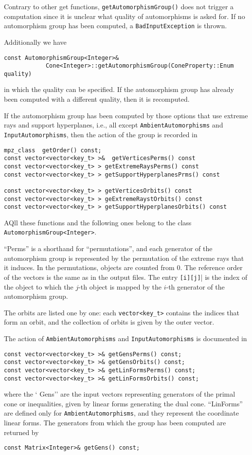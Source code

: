 \documentclass[12pt,a4paper]{scrartcl}
\theoremstyle{definition}
\begin{document}
\begin{small}
Contrary to other get functions, \verb|getAutomorphismGroup()| does not trigger a computation since it is unclear what quality of automorphisms is asked for. If no automorphism group has been computed, a \verb|BadInputException| is thrown.

Additionally we have
\begin{Verbatim}
const AutomorphismGroup<Integer>& 
            Cone<Integer>::getAutomorphismGroup(ConeProperty::Enum quality)
\end{Verbatim}
in which the quality can be specified. If the automorphism group has already been computed with a different quality, then it is recomputed.

If the automorphism group has been computed by those options that use extreme rays and support hyperplanes, i.e., all except \verb|AmbientAutomorphisms| and \verb|InputAutomorphisms|, then the action of the group is recorded in
\begin{Verbatim}
mpz_class  getOrder() const;
const vector<vector<key_t> >&  getVerticesPerms() const
const vector<vector<key_t> > getExtremeRaysPerms() const
const vector<vector<key_t> > getSupportHyperplanesPrms() const

const vector<vector<key_t> > getVerticesOrbits() const
const vector<vector<key_t> > geExtremeRaystOrbits() const
const vector<vector<key_t> > getSupportHyperplanesOrbits() const
\end{Verbatim}
AQll these functions and the following ones belong to the class \verb|AutomorphismGroup<Integer>|.

``Perms'' is a shorthand for ``permutations'', and each generator of the automorphism group is represented by the permutation of the extreme rays that it induces. In the permutations, objects are counted from $0$. The reference order of the vectors is the same as in the output files. The entry \verb|[i][j]|| is the index of the object to which the $j$-th object is mapped by the $i$-th generator of the automorphism group.

The orbits are listed one by one: each \verb|vector<key_t>| contains the indices that form an orbit, and the collection of orbits is given by the outer vector.

The action  of \verb|AmbientAutomorphisms| and \verb|InputAutomorphisms| is documented in
\begin{Verbatim}
const vector<vector<key_t> >& getGensPerms() const;
const vector<vector<key_t> >& getGensOrbits() const;
const vector<vector<key_t> >& getLinFormsPerms() const;
const vector<vector<key_t> >& getLinFormsOrbits() const; 
\end{Verbatim}
where the ` Gens'' are the input vectors representing generators of the primal cone or inequalities, given by linear forms  generating the dual cone. ``LinForms'' are defined only for \verb|AmbientAutomorphisms|, and they represent the coordinate linear forms. The generators from which the group has been computed are returned by
\begin{Verbatim}
const Matrix<Integer>& getGens() const;
\end{Verbatim}


\end{small}
\end{document}
